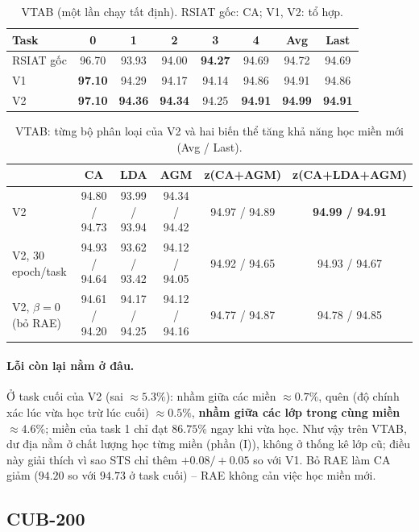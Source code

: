 \documentclass[11pt]{article}
\begin{document}
\begin{table}[H]
\centering\small
\caption{VTAB (một lần chạy tất định). RSIAT gốc: CA; V1, V2: tổ hợp.}
\begin{tabular}{l*{5}{c}cc}
\toprule
Task & 0 & 1 & 2 & 3 & 4 & Avg & Last \\
\midrule
RSIAT gốc & 96.70 & 93.93 & 94.00 & \textbf{94.27} & 94.69 & 94.72 & 94.69 \\
V1 & \textbf{97.10} & 94.29 & 94.17 & 94.14 & 94.86 & 94.91 & 94.86 \\
V2 & \textbf{97.10} & \textbf{94.36} & \textbf{94.34} & 94.25 & \textbf{94.91} & \textbf{94.99} & \textbf{94.91} \\
\bottomrule
\end{tabular}
\end{table}

\begin{table}[H]
\centering\small
\caption{VTAB: từng bộ phân loại của V2 và hai biến thể tăng khả năng học miền mới (Avg / Last).}
\begin{tabular}{lccccc}
\toprule
 & CA & LDA & AGM & z(CA+AGM) & z(CA+LDA+AGM) \\
\midrule
V2 & 94.80 / 94.73 & 93.99 / 93.94 & 94.34 / 94.42 & 94.97 / 94.89 & \textbf{94.99 / 94.91} \\
V2, 30 epoch/task & 94.93 / 94.64 & 93.62 / 93.42 & 94.12 / 94.05 & 94.92 / 94.65 & 94.93 / 94.67 \\
V2, $\beta=0$ (bỏ RAE) & 94.61 / 94.20 & 94.17 / 94.25 & 94.12 / 94.16 & 94.77 / 94.87 & 94.78 / 94.85 \\
\bottomrule
\end{tabular}
\end{table}

\paragraph{Lỗi còn lại nằm ở đâu.} Ở task cuối của V2 (sai $\approx5.3\%$): nhầm giữa các miền $\approx0.7\%$, quên
(độ chính xác lúc vừa học trừ lúc cuối) $\approx0.5\%$, \textbf{nhầm giữa các lớp trong cùng miền $\approx4.6\%$}; miền
của task 1 chỉ đạt $86.75\%$ ngay khi vừa học. Như vậy trên VTAB, dư địa nằm ở chất lượng học từng miền (phần (I)),
không ở thống kê lớp cũ; điều này giải thích vì sao STS chỉ thêm $+0.08/+0.05$ so với V1. Bỏ RAE làm CA giảm
($94.20$ so với $94.73$ ở task cuối) -- RAE không cản việc học miền mới.

\subsection{CUB-200}
\end{document}
